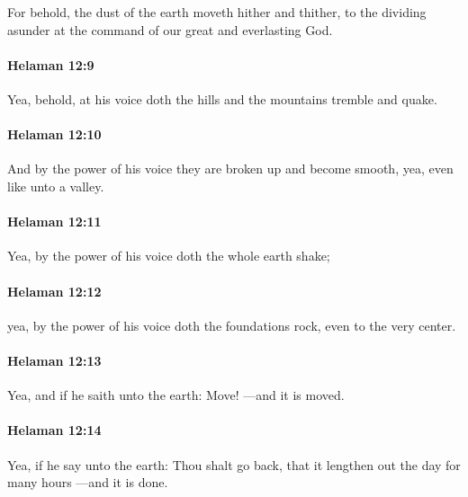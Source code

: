 			For behold, the dust of the earth moveth hither and thither,
			to the dividing asunder at the command of our great and everlasting God.

		\paragraph{Helaman 12:9} %
			\label{HELAMAN-12-9}

			Yea, behold, at his voice doth the hills and the mountains tremble and quake.

		\paragraph{Helaman 12:10} %
			\label{HELAMAN-12-10}

			And by the power of his voice they are broken up and become smooth,
			yea, even like unto a valley.

		\paragraph{Helaman 12:11} %
			\label{HELAMAN-12-11}

			Yea, by the power of his voice doth the whole earth shake;

		\paragraph{Helaman 12:12} %
			\label{HELAMAN-12-12}

			yea, by the power of his voice doth the foundations rock,
			even to the very center.

		\paragraph{Helaman 12:13} %
			\label{HELAMAN-12-13}

			Yea, and if he saith unto the earth: Move!
			---and it is moved.

		\paragraph{Helaman 12:14} %
			\label{HELAMAN-12-14}

			Yea, if he say unto the earth:
			Thou shalt go back, that it lengthen out the day for many hours
			---and it is done.


